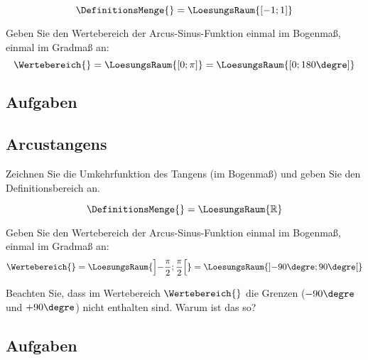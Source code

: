 

$$\DefinitionsMenge{} = \LoesungsRaum{[-1; 1]}$$

Geben Sie den Wertebereich der Arcus-Sinus-Funktion einmal im Bogenmaß,
einmal im Gradmaß an:
$$\Wertebereich{} = \LoesungsRaum{[0; \pi]}  =  \LoesungsRaum{[0; 180\degre]}$$
\newpage
\subsection*{Aufgaben}

\trigsysDcos{}

\TNTeop{}


\subsection{Arcustangens}
Zeichnen Sie die Umkehrfunktion des Tangens (im Bogenmaß) und geben Sie den Definitionsbereich an.



$$\DefinitionsMenge{} = \LoesungsRaum{\mathbb{R}}$$

Geben Sie den Wertebereich der Arcus-Sinus-Funktion einmal im Bogenmaß,
einmal im Gradmaß an:
$$\Wertebereich{} = \LoesungsRaum{\left]-\frac{\pi}{2}; \frac{\pi}{2}\right[}  = \LoesungsRaum{\left]-90\degre; 90\degre\right[}$$

Beachten Sie, dass im Wertebereich $\Wertebereich{}$ die Grenzen ($-90\degre$und $+90\degre$) nicht enthalten sind. Warum ist das so?

\subsection*{Aufgaben}
\TNTeop{}


